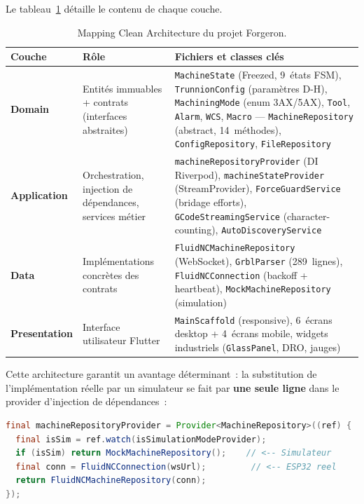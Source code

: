 \documentclass[12pt,a4paper]{report}
\newcommand{\code}[1]{\texttt{\small #1}}
\begin{document}
Le tableau~\ref{tab:clean_arch} détaille le contenu de chaque couche.

\begin{table}[H]
\centering
\caption{Mapping Clean Architecture du projet Forgeron.}
\label{tab:clean_arch}
\begin{tabularx}{\textwidth}{>{\bfseries}l p{3cm} X}
\toprule
Couche & Rôle & Fichiers et classes clés \\
\midrule
\rowcolor{red!5}
Domain & Entités immuables + contrats (interfaces abstraites) & \code{MachineState} (Freezed, 9~états FSM), \code{TrunnionConfig} (paramètres D-H), \code{MachiningMode} (enum 3AX/5AX), \code{Tool}, \code{Alarm}, \code{WCS}, \code{Macro} --- \code{MachineRepository} (abstract, 14~méthodes), \code{ConfigRepository}, \code{FileRepository} \\
\rowcolor{orange!5}
Application & Orchestration, injection de dépendances, services métier & \code{machineRepositoryProvider} (DI Riverpod), \code{machineStateProvider} (StreamProvider), \code{ForceGuardService} (bridage efforts), \code{GCodeStreamingService} (character-counting), \code{AutoDiscoveryService} \\
\rowcolor{green!5}
Data & Implémentations concrètes des contrats & \code{FluidNCMachineRepository} (WebSocket), \code{GrblParser} (289~lignes), \code{FluidNCConnection} (backoff + heartbeat), \code{MockMachineRepository} (simulation) \\
\rowcolor{blue!5}
Presentation & Interface utilisateur Flutter & \code{MainScaffold} (responsive), 6~écrans desktop + 4~écrans mobile, widgets industriels (\code{GlassPanel}, DRO, jauges) \\
\bottomrule
\end{tabularx}
\end{table}

Cette architecture garantit un avantage déterminant~: la substitution de l'implémentation réelle par un simulateur se fait par \textbf{une seule ligne} dans le provider d'injection de dépendances~:

\begin{lstlisting}[language=Java, caption={Provider DI --- bascule Mock/FluidNC (inversion de dépendance).}, label={lst:di}]
final machineRepositoryProvider = Provider<MachineRepository>((ref) {
  final isSim = ref.watch(isSimulationModeProvider);
  if (isSim) return MockMachineRepository();    // <-- Simulateur
  final conn = FluidNCConnection(wsUrl);         // <-- ESP32 reel
  return FluidNCMachineRepository(conn);
});
\end{lstlisting}
\end{document}
